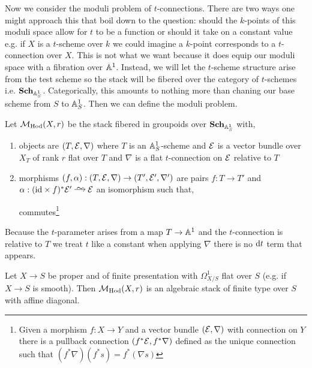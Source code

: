 \documentclass[12pt]{article}
\begin{document}
Now we consider the moduli problem of $t$-connections. There are two ways one might approach this that boil down to the question: should the $k$-points of this moduli space allow for $t$ to be a function or should it take on a constant value e.g. if $X$ is a $t$-scheme over $k$ we could imagine a $k$-point corresponds to a $t$-connection over $X$. This is not what we want because it does equip our moduli space with a fibration over $\mathbb{A}^1$. Instead, we will let the $t$-scheme structure arise from the test scheme so the stack will be fibered over the category of $t$-schemes i.e. $\mathbf{Sch}_{\mathbb{A}^1_S}$. Categorically, this amounts to nothing more than chaning our base scheme from $S$ to $\mathbb{A}^1_S$. Then we can define the moduli problem.


\begin{defn}
Let $\mathcal{M}_{\mathrm{Hod}}(X, r)$ be the stack fibered in groupoids over $\mathbf{Sch}_{\mathbb{A}^1_S}$ with,
\begin{enumerate}
\item objects are $(T, \mathcal{E}, \nabla)$ where $T$ is an $\mathbb{A}^1_{S}$-scheme and $\mathcal{E}$ is a vector bundle over $X_T$ of rank $r$ flat over $T$ and $\nabla$ is a flat $t$-connection on $\mathcal{E}$ relative to $T$
\item morphisms $(f, \alpha) : (T, \mathcal{E}, \nabla) \to (T', \mathcal{E}', \nabla')$ are pairs $f : T \to T'$ and $\alpha : (\id \times f)^* \E' \iso \E$ an isomorphism such that,
\begin{center}
\end{center}
commutes\footnote{Given a morphism $f : X \to Y$ and a vector bundle $(\mathcal{E}, \nabla)$ with connection on $Y$ there is a pullback connection $(f^* \mathcal{E}, f^* \nabla)$ defined as the unique connection such that $(f^* \nabla) (f^* s) = f^* (\nabla s)$ }
\end{enumerate}
\end{defn}

\begin{rmk}
Because the $t$-parameter arises from a map $T \to \mathbb{A}^1$ and the $t$-connection is relative to $T$ we treat $t$ like a constant when applying $\nabla$ there is no $\mathrm{d}{t}$ term that appears.
\end{rmk}

\begin{prop}
Let $X \to S$ be proper and of finite presentation with $\Omega^1_{X/S}$ flat over $S$ (e.g. if $X \to S$ is smooth). Then $\mathcal{M}_{\mathrm{Hod}}(X, r)$ is an algebraic stack of finite type over $S$ with affine diagonal.
\end{prop}
\end{document}
